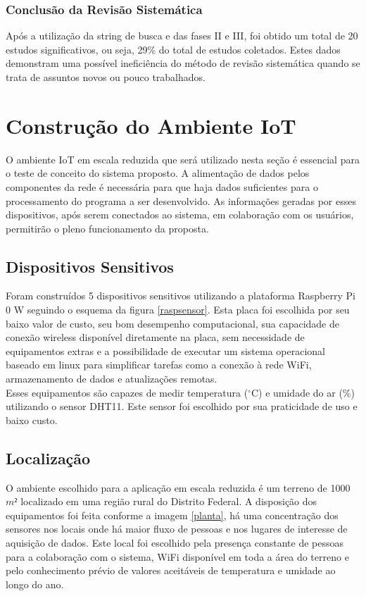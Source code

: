 \subsubsection{Conclusão da Revisão Sistemática}
\quad Após a utilização da string de busca e das fases II e III, foi obtido um total de 20 estudos significativos,
ou seja, 29\% do total de estudos coletados. Estes dados demonstram uma possível ineficiência do método
de revisão sistemática quando se trata de assuntos novos ou pouco trabalhados.

\section{Construção do Ambiente IoT}
\quad O ambiente \acrshort{IoT} em escala reduzida que será utilizado nesta seção é essencial para o teste de conceito
do sistema proposto. A alimentação de dados pelos componentes da rede é necessária para que haja
dados suficientes para o processamento do programa a ser desenvolvido. As informações geradas por esses dispositivos, após serem conectados ao sistema, em colaboração
com os usuários, permitirão o pleno funcionamento da proposta.
\subsection{Dispositivos Sensitivos}
\quad Foram construídos 5 dispositivos sensitivos utilizando a plataforma Raspberry Pi 0 W seguindo o esquema da figura \ref{raspsensor}. Esta placa
foi escolhida por seu baixo valor de custo, seu bom desempenho computacional, sua capacidade de conexão wireless disponível diretamente na placa, sem necessidade de equipamentos extras e a possibilidade de executar um sistema operacional baseado em linux para simplificar tarefas como a conexão à rede WiFi, armazenamento de dados e atualizações remotas.
\\\null \quad Esses equipamentos são capazes de medir temperatura ($^\circ$C) e umidade do ar (\%) utilizando o sensor DHT11. Este sensor foi escolhido
por sua praticidade de uso e baixo custo.
\subsection{Localização}
\quad O ambiente escolhido para a aplicação em escala reduzida é um terreno de 1000 $m²$ localizado em uma
região rural do Distrito Federal. A disposição dos equipamentos foi feita conforme a imagem \ref{planta},
há uma concentração dos sensores nos locais onde há maior fluxo de pessoas e nos lugares de interesse de
aquisição de dados.
  Este local foi escolhido pela presença constante de pessoas para a colaboração com o sistema, WiFi disponível em toda a área do terreno e pelo conhecimento prévio de valores aceitáveis de temperatura
  e umidade ao longo do ano.
\newpage
{}

